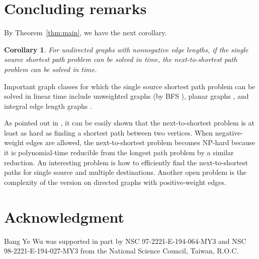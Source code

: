 \documentclass[review]{elsarticle}
\newtheorem{cor}[thm]{Corollary}
\begin{document}
\section{Concluding remarks}
By Theorem~\ref{thm:main}, we have the next corollary.
\begin{cor}
For undirected graphs with nonnegative edge lengths, if the single
source shortest path problem can be solved in  time, the
next-to-shortest path problem can be solved in  time.
\end{cor}
Important graph classes for which the single source shortest path
problem can be solved in linear time include unweighted graphs (by
BFS \cite{cor01}), planar graphs \cite{hen97}, and integral edge
length graphs \cite{thr99}.

As pointed out in \cite{li06,wu10}, it can be easily shown that the next-to-shortest problem is at least as hard as finding a shortest path between two vertices. When negative-weight edges are allowed, the next-to-shortest problem becomes NP-hard because it is polynomial-time reducible from the longest path problem by a similar reduction. 
An interesting problem is how to efficiently find the next-to-shortest paths for single source and multiple destinations. Another open problem is the complexity of the version on directed graphs with positive-weight edges.

\section*{Acknowledgment}
Bang Ye Wu was supported in part by NSC 97-2221-E-194-064-MY3 and
NSC 98-2221-E-194-027-MY3 from the National Science Council, Taiwan,
R.O.C.
\end{document}
